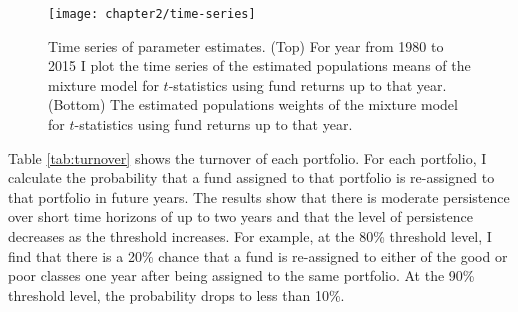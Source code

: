 		\begin{figure}[t]
			\small
			\centering
			\texttt{[image: chapter2/time-series]}
			\captionsetup{skip=-20pt, font=footnotesize, justification=justified, width=\textwidth}
			\caption[Time series of parameter estimates]{Time series of parameter estimates. (Top) For year from 1980 to 2015 I plot the time series of the estimated populations means of the mixture model for $t$-statistics using fund returns up to that year. (Bottom) The estimated populations weights of the mixture model for $t$-statistics using fund returns up to that year.}
			\label{fig:estimates}
		\end{figure}

		Table \ref{tab:turnover} shows the turnover of each portfolio.  For each portfolio, I calculate the probability that a fund assigned to that portfolio is re-assigned to that portfolio in future years.  The results show that there is moderate persistence over short time horizons of up to two years and that the level of persistence decreases as the threshold increases. For example, at the 80\% threshold level, I find that there is a 20\% chance that a fund is re-assigned to either of the good or poor classes one year after being assigned to the same portfolio.  At the 90\% threshold level, the probability drops to less than 10\%.

